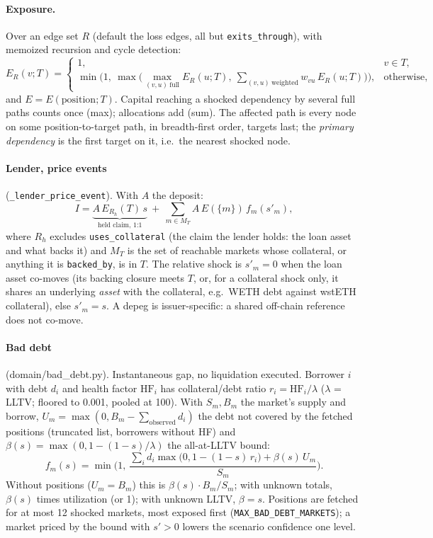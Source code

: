 \documentclass[11pt,a4paper]{article}
\newcommand{\code}[1]{\texttt{#1}}
\newcommand{\src}[1]{\textsf{\small #1}}
\begin{document}
\paragraph{Exposure.} Over an edge set $R$ (default the loss edges, all but
\code{exits\_through}), with memoized recursion and cycle detection:
\begin{equation}
E_R(v;T)=\begin{cases}1, & v\in T,\\
\min\Big(1,\ \max\big(\max_{(v,u)\ \text{full}}E_R(u;T),\ \sum_{(v,u)\ \text{weighted}}w_{vu}\,E_R(u;T)\big)\Big), & \text{otherwise,}\end{cases}
\end{equation}
and $E=E(\text{position};T)$. Capital reaching a shocked dependency by several
full paths counts once (max); allocations add (sum). The affected path is every
node on some position-to-target path, in breadth-first order, targets last; the
\emph{primary dependency} is the first target on it, i.e.\ the nearest shocked
node.

\paragraph{Lender, price events} (\code{\_lender\_price\_event}). With $A$ the
deposit:
\begin{equation}
I=\underbrace{A\,E_{R_h}(T)\,s}_{\text{held claim, 1:1}}\ +\ \sum_{m\in M_T}A\,E(\{m\})\,f_m(s'_m),
\end{equation}
where $R_h$ excludes \code{uses\_collateral} (the claim the lender holds: the loan
asset and what backs it) and $M_T$ is the set of reachable markets whose
collateral, or anything it is \code{backed\_by}, is in $T$. The relative shock is
$s'_m=0$ when the loan asset co-moves (its backing closure meets $T$, or, for a
collateral shock only, it shares an underlying \emph{asset} with the collateral,
e.g.\ WETH debt against wstETH collateral), else $s'_m=s$. A depeg is
issuer-specific: a shared off-chain reference does not co-move.

\paragraph{Bad debt} (\src{domain/bad\_debt.py}). Instantaneous gap, no
liquidation executed. Borrower $i$ with debt $d_i$ and health factor $\text{HF}_i$
has collateral/debt ratio $r_i=\text{HF}_i/\lambda$ ($\lambda$ = LLTV; floored to
0.001, pooled at 100). With $S_m,B_m$ the market's supply and borrow,
$U_m=\max(0,B_m-\sum_{\text{observed}}d_i)$ the debt not covered by the fetched
positions (truncated list, borrowers without HF) and
$\beta(s)=\max(0,1-(1-s)/\lambda)$ the all-at-LLTV bound:
\begin{equation}
f_m(s)=\min\Big(1,\ \frac{\sum_i d_i\max\big(0,1-(1-s)\,r_i\big)+\beta(s)\,U_m}{S_m}\Big).
\end{equation}
Without positions ($U_m=B_m$) this is $\beta(s)\cdot B_m/S_m$; with unknown totals,
$\beta(s)$ times utilization (or 1); with unknown LLTV, $\beta=s$. Positions are
fetched for at most 12 shocked markets, most exposed first
(\code{MAX\_BAD\_DEBT\_MARKETS}); a market priced by the bound with $s'>0$ lowers
the scenario confidence one level.
\end{document}

